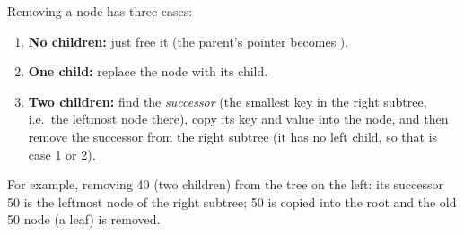Removing a node has three cases:
\begin{enumerate}
  \item \textbf{No children:} just free it (the parent's pointer becomes ).
  \item \textbf{One child:} replace the node with its child.
  \item \textbf{Two children:} find the \emph{successor} (the smallest key in the right
    subtree, i.e.\ the leftmost node there), copy its key and value into the node, and then
    remove the successor from the right subtree (it has no left child, so that is case 1 or 2).
\end{enumerate}
For example, removing 40 (two children) from the tree on the left: its
successor 50 is the leftmost node of the right subtree; 50 is copied into the
root and the old 50 node (a leaf) is removed.

\begin{center}
\end{center}

